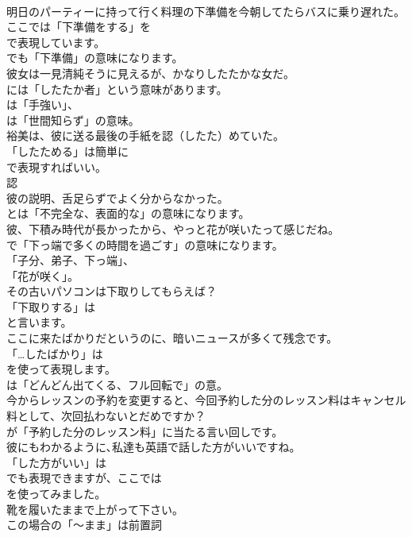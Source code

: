 \documentclass[8pt]{extreport}
\begin{document}
\begin{CJK}{UTF8}{min}
\\	明日のパーティーに持って行く料理の下準備を今朝してたらバスに乗り遅れた。 
\\	ここでは「下準備をする」を 
\\	で表現しています。
\\	でも「下準備」の意味になります。	
\\	彼女は一見清純そうに見えるが、かなりしたたかな女だ。 
\\	には「したたか者」という意味があります。
\\	は「手強い」、
\\	は「世間知らず」の意味。	
\\	裕美は、彼に送る最後の手紙を認（したた）めていた。 
\\	「したためる」は簡単に
\\	で表現すればいい。	
\\	認
\\	彼の説明、舌足らずでよく分からなかった。 
\\	とは「不完全な、表面的な」の意味になります。	
\\	彼、下積み時代が長かったから、やっと花が咲いたって感じだね。 
\\	で「下っ端で多くの時間を過ごす」の意味になります。
\\	「子分、弟子、下っ端」、
\\	「花が咲く」。	
\\	その古いパソコンは下取りしてもらえば？ 
\\	「下取りする」は
\\	と言います。	
\\	ここに来たばかりだというのに、暗いニュースが多くて残念です。 
\\	「…したばかり」は 
\\	を使って表現します。
\\	は「どんどん出てくる、フル回転で」の意。	
\\	今からレッスンの予約を変更すると、今回予約した分のレッスン料はキャンセル料として、次回払わないとだめですか？ 
\\	が「予約した分のレッスン料」に当たる言い回しです。	
\\	彼にもわかるように､私達も英語で話した方がいいですね。 
\\	「した方がいい」は
\\	でも表現できますが、ここでは
\\	を使ってみました。	
\\	靴を履いたままで上がって下さい。 
\\	この場合の「～まま」は前置詞

\end{CJK}
\end{document}
